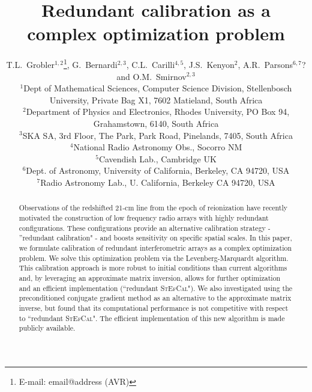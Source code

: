 \documentclass[useAMS,usenatbib]{mn2e}
\title[Redundant interferometric calibration as a complex optimization problem]{Redundant calibration as a complex optimization problem}
\author[T.L.~Grobler et al.]{T.L.~Grobler$^{1,2}$\thanks{E-mail: email@address (AVR)}, G.~Bernardi$^{2,3}$, C.L.~Carilli$^{4,5}$, J.S.~Kenyon$^{2}$, A.R.~Parsons$^{6,7}$? \newauthor and O.M.~Smirnov$^{2,3}$\\
$^{1}$Dept of Mathematical Sciences, Computer Science Division, Stellenbosch University, Private Bag X1, 7602 Matieland, South Africa\\
$^{2}$Department of Physics and Electronics, Rhodes University, PO Box 94, Grahamstown, 6140, South Africa\\
$^{3}$SKA SA, 3rd Floor, The Park, Park Road, Pinelands, 7405, South Africa\\
$^{4}$National Radio Astronomy Obs., Socorro NM\\
$^{5}$Cavendish Lab., Cambridge UK\\
$^{6}$Dept. of Astronomy, University of California, Berkeley, CA 94720, USA\\
$^{7}$Radio Astronomy Lab., U. California, Berkeley CA 94720, USA}
\begin{document}

\pagerange{\pageref{firstpage}--\pageref{lastpage}} 

\maketitle

\label{firstpage}

\begin{abstract}
Observations of the redshifted 21-cm line from the epoch of reionization have recently motivated the construction of low 
frequency radio arrays with highly redundant configurations. These configurations provide an alternative calibration strategy - 
''redundant calibration" - and boosts sensitivity on specific spatial scales. In this paper, we formulate 
calibration of redundant interferometric arrays as a complex optimization problem. 
We solve this optimization problem via the Levenberg-Marquardt algorithm. This calibration approach is more 
robust to initial conditions than current algorithms and, by leveraging an approximate matrix inversion, allows for further optimization and an efficient implementation (``redundant \textsc{StEfCal}"). We also investigated using the preconditioned conjugate gradient method as an alternative to the approximate matrix inverse, but found that its computational performance is not competitive with respect to ``redundant \textsc{StEfCal}". The efficient implementation of this new algorithm is made publicly available.

\end{abstract}
\end{document}
